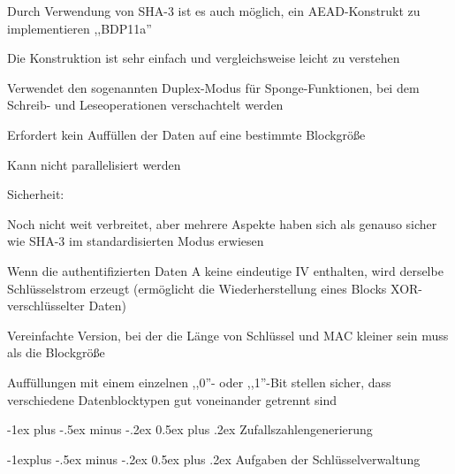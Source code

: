 \documentclass[a4paper]{article}
\makeatletter
\renewcommand{\section}{\@startsection{section}{1}{0mm}%
 {-1ex plus -.5ex minus -.2ex}%
 {0.5ex plus .2ex}%
 {\normalfont\large\bfseries}}
\renewcommand{\subsection}{\@startsection{subsection}{2}{0mm}%
 {-1explus -.5ex minus -.2ex}%
 {0.5ex plus .2ex}%
 {\normalfont\normalsize\bfseries}}
\makeatother
\begin{document}
\begin{multicols}{3}
      \begin{itemize*}
            \item Durch Verwendung von SHA-3 ist es auch möglich, ein AEAD-Konstrukt zu
            implementieren ,,BDP11a''
            \item Die Konstruktion ist sehr einfach und vergleichsweise leicht zu
            verstehen
            \item Verwendet den sogenannten Duplex-Modus für Sponge-Funktionen, bei dem
            Schreib- und Leseoperationen verschachtelt werden
            \item Erfordert kein Auffüllen der Daten auf eine bestimmte Blockgröße
            \item Kann nicht parallelisiert werden
            \item Sicherheit:
            \begin{itemize*}
                  \item Noch nicht weit verbreitet, aber mehrere Aspekte haben sich als genauso sicher wie SHA-3 im standardisierten Modus erwiesen
                  \item Wenn die authentifizierten Daten A keine eindeutige IV enthalten, wird derselbe Schlüsselstrom erzeugt (ermöglicht die Wiederherstellung eines Blocks XOR-verschlüsselter Daten)
            \end{itemize*}
            \begin{itemize*}
                  \item Vereinfachte Version, bei der die Länge von Schlüssel und MAC kleiner sein muss als die Blockgröße
                  \item Auffüllungen mit einem einzelnen ,,0''- oder ,,1''-Bit stellen sicher, dass verschiedene Datenblocktypen gut voneinander getrennt sind
            \end{itemize*}
      \end{itemize*}


      \section{Zufallszahlengenerierung}


      \subsection{Aufgaben der
            Schlüsselverwaltung}


\end{multicols}
\end{document}
